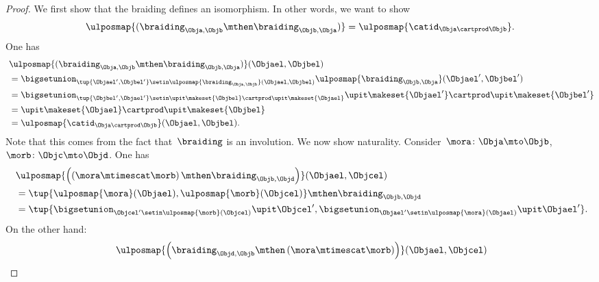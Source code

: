 \begin{proof}
    We first show that the braiding defines an isomorphism.
    In other words, we want to show
    \begin{equation}
        \ulposmap{(\braiding_{\Obja,\Objb}\mthen \braiding_{\Objb,\Obja})}=\ulposmap{\catid_{\Obja \cartprod \Objb}}.
    \end{equation}
    One has
    \begin{equation}
        \begin{aligned}
            ~ & \ulposmap{(\braiding_{\Obja,\Objb}\mthen \braiding_{\Objb,\Obja})}(\Objael,\Objbel) \\
              & =\bigsetunion_{\tup{\Objael',\Objbel'}\setin \ulposmap{\braiding_{\Obja,\Objb}}(\Objael,\Objbel)}\ulposmap{\braiding_{\Objb,\Obja}}(\Objael',\Objbel') \\
              & =\bigsetunion_{\tup{\Objbel',\Objael'}\setin \upit\makeset{\Objbel}\cartprod \upit\makeset{\Objael}}\upit\makeset{ \Objael'}\cartprod \upit\makeset{ \Objbel'} \\
              & =\upit\makeset{\Objael} \cartprod \upit\makeset{\Objbel} \\
              & =\ulposmap{\catid_{\Obja\cartprod \Objb}}(\Objael,\Objbel).
        \end{aligned}
    \end{equation}
    Note that this comes from the fact that~$\braiding$ is an involution.
    We now show naturality.
    Consider~$\mora \colon \Obja \mto \Objb$,~$\morb\colon \Objc \mto \Objd$.
    One has
    \begin{equation}
        \label{eq:braid-upos-natural-a}
        \begin{aligned}
            ~ & \ulposmap{\left(\left( \mora \mtimescat \morb\right)\mthen \braiding_{ \Objb, \Objd}\right)}(\Objael,\Objcel) \\
              & = \tup{\ulposmap{\mora}(\Objael),\ulposmap{\morb}(\Objcel)}\mthen \braiding_{ \Objb, \Objd} \\
              & =\tup{\bigsetunion_{\Objcel'\setin \ulposmap{\morb}(\Objcel)}\upit \Objcel',\bigsetunion_{\Objael'\setin \ulposmap{\mora}(\Objael)}\upit \Objael'}.
        \end{aligned}
    \end{equation}
    On the other hand:
    \begin{equation}
        \label{eq:braid-upos-natural-b}
        \begin{aligned}
            ~ & \ulposmap{\left(\braiding_{ \Objd, \Objb}\mthen \left( \mora \mtimescat \morb\right)\right)}(\Objael,\Objcel) \\

\end{aligned}
\end{equation}
\end{proof}

